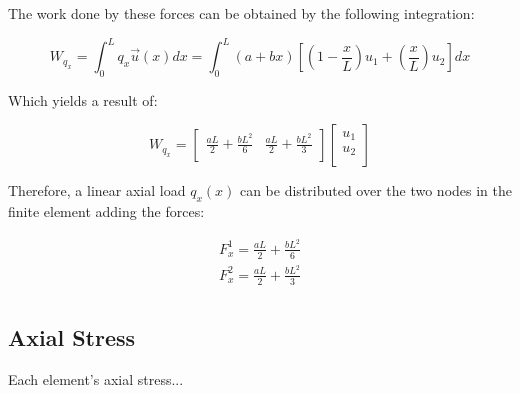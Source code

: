 The work done by these forces can be obtained by the following integration:

\[
  W_{q_x} = \int_{0}^{L} q_x \vec{u}(x) dx = \int_{0}^{L} (a + bx) \left[ \left( 1 - \frac{x}{L} \right) u_1 + \left( \frac{x}{L} \right) u_2 \right] dx
\]

Which yields a result of:

\[
  W_{q_x} =
  \begin{bmatrix}
    \frac{a L}{2} + \frac{b L^2}{6} & \frac{a L}{2} + \frac{b L^2}{3} \\
  \end{bmatrix}
  \begin{bmatrix}
    u_1 \\
    u_2 \\
  \end{bmatrix}
\]

Therefore, a linear axial load $q_x(x)$ can be distributed over the two nodes in the finite element adding the forces:

\begin{equation}
  \begin{split}
    F_x^1 = \frac{a L}{2} + \frac{b L^2}{6} \\
    F_x^2 = \frac{a L}{2} + \frac{b L^2}{3} \\
  \end{split}
\end{equation}


\subsection{Axial Stress}

Each element's axial stress...
